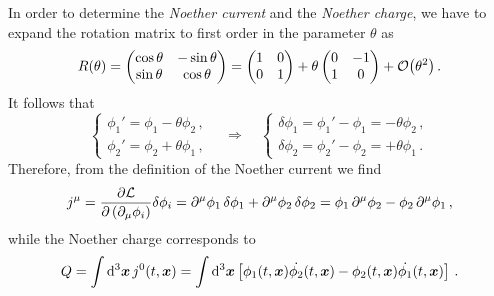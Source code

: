 \begin{sol}
    In order to determine the \emph{Noether current} and the \emph{Noether charge}, we have to expand the rotation matrix to first order in the parameter $\theta$ as
    \begin{equation}
        R(\theta) =
        \begin{pmatrix}
            \cos \theta & - \sin \theta \\
            \sin \theta & \cos \theta 
        \end{pmatrix}
        =
        \begin{pmatrix}
            1 & 0 \\
            0 & 1 
        \end{pmatrix}
        + \theta
        \begin{pmatrix}
            0 & -1 \\
            1 & 0 
        \end{pmatrix}
        + \order{\theta^2} \, .
    \end{equation}
    It follows that
    \begin{equation}
        \begin{cases}
            \phi_1' = \phi_1 - \theta \phi_2 \, ,\\
            \phi_2' = \phi_2 + \theta \phi_1 \, ,
        \end{cases}
        \quad \Longrightarrow \quad
        \begin{cases}
            \delta\phi_1 = \phi_1' - \phi_1 = - \theta \phi_2 \,, \\
            \delta\phi_2 = \phi_2' - \phi_2 = + \theta \phi_1 \,.
        \end{cases}
    \end{equation}
    Therefore, from the definition of the Noether current we find
    \begin{equation}
        j^\mu 
        = \frac{\partial\mathcal{L}}{\partial\left(\partial_\mu \phi_i\right)} \delta \phi_i 
        = \partial^\mu \phi_1 \, \delta \phi_1 + \partial^\mu \phi_2 \, \delta \phi_2 
        = \phi_1 \, \partial^\mu \phi_2 - \phi_2 \, \partial^\mu \phi_1 \,,
    \end{equation}
    while the Noether charge corresponds to
    \begin{equation}
        Q 
        = \int {\rm d}^3\boldsymbol{x} \, j^0(t, \boldsymbol{x}) 
        = \int {\rm d}^3\boldsymbol{x} \left[\phi_1(t, \boldsymbol{x}) \dot{\phi_2}(t, \boldsymbol{x}) - \phi_2(t, \boldsymbol{x}) \dot{\phi_1}(t, \boldsymbol{x})\right] \,.
    \end{equation}
\end{sol}